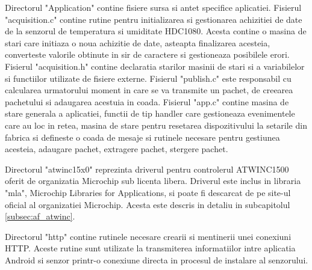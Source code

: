 Directorul "Application" contine fisiere sursa si antet specifice aplicatiei. Fisierul "acquisition.c" contine rutine pentru initializarea si gestionarea achizitiei 
de date de la senzorul de temperatura si umiditate HDC1080. Acesta contine o masina de stari care initiaza o noua achizitie de date, asteapta finalizarea acesteia, 
converteste valorile obtinute in sir de caractere si gestioneaza posibilele erori. Fisierul "acquisition.h" contine declaratia starilor masinii de stari si a 
variabilelor si functiilor utilizate de fisiere externe. Fisierul "publish.c" este responsabil cu calcularea urmatorului moment in care se va transmite un pachet,
de creearea pachetului si adaugarea acestuia in coada. Fisierul "app.c" contine masina de stare generala a aplicatiei, functii de tip handler care gestioneaza 
evenimentele care au loc in retea, masina de stare pentru resetarea dispozitivului la setarile din fabrica si defineste o coada de mesaje si rutinele necesare 
pentru gestiunea acesteia, adaugare pachet, extragere pachet, stergere pachet. 

Directorul "atwinc15x0" reprezinta driverul pentru controlerul ATWINC1500 oferit de organizatia Microchip sub licenta libera. Driverul este inclus in libraria 
"mla", Microchip Libraries for Applications, si poate fi descarcat de pe site-ul oficial al organizatiei Microchip. Acesta este descris in detaliu in subcapitolul
\ref{subsec:af_atwinc}.

Directorul "http" contine rutinele necesare crearii si mentinerii unei conexiuni HTTP. Aceste rutine sunt utilizate la transmiterea informatiilor intre aplicatia 
Android si senzor printr-o conexiune directa in procesul de instalare al senzorului.

